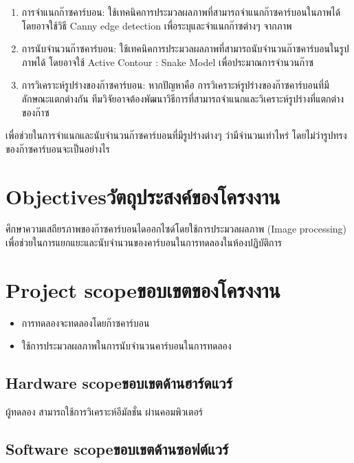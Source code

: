 \begin{enumerate}
    \item {การจำแนกก๊าซคาร์บอน: ใช้เทคนิคการประมวลผลภาพที่สามารถจำแนกก๊าซคาร์บอนในภาพได้ \newline
    โดยอาจใช้วิธี Canny edge detection เพื่อระบุและจำแนกก๊าซต่างๆ จากภาพ}
    \item {การนับจำนวนก๊าซคาร์บอน: ใช้เทคนิคการประมวลผลภาพที่สามารถนับจำนวนก๊าซคาร์บอนในรูป \newline
    ภาพได้ โดยอาจใช้ Active Contour : Snake Model เพื่อประมาณการจำนวนก๊าซ}
    \item {การวิเคราะห์รูปร่างของก๊าซคาร์บอน: หากปัญหาคือ การวิเคราะห์รูปร่างของก๊าซคาร์บอนที่มีลักษณะแตกต่างกัน ทีมวิจัยอาจต้องพัฒนาวิธีการที่สามารถจำแนกและวิเคราะห์รูปร่างที่แตกต่างของก๊าซ}
\end{enumerate}

เพื่อช่วยในการจำแนกและนับจำนวนก๊าซคาร์บอนที่มีรูปร่างต่างๆ ว่ามีจำนวนเท่าไหร่ โดยไม่ว่ารูปทรงของก๊าซคาร์บอนจะเป็นอย่างไร

\section{\ifenglish Objectives\else วัตถุประสงค์ของโครงงาน\fi}

\hspace{0.5 cm}ศึกษาความเสถียรภาพของก๊าซคาร์บอนไดออกไซด์โดยใช้การประมวลผลภาพ (Image processing) \newline
เพื่อช่วยในการแยกแยะและนับจำนวนของคาร์บอนในการทดลองในห้องปฏิบัติการ

\section{\ifenglish Project scope\else ขอบเขตของโครงงาน\fi}
\begin{itemize}
    \item {การทดลองจะทดลองโดยก๊าซคาร์บอน}
    \item {ใช้การประมวลผลภาพในการนับจำนวนคาร์บอนในการทดลอง}
\end{itemize}

\subsection{\ifenglish Hardware scope\else ขอบเขตด้านฮาร์ดแวร์\fi}

\hspace{0.5 cm}ผู้ทดลอง สามารถใช้การวิเคราะห์อีมัลชั่น ผ่านคอมพิวเตอร์

\subsection{\ifenglish Software scope\else ขอบเขตด้านซอฟต์แวร์\fi}

